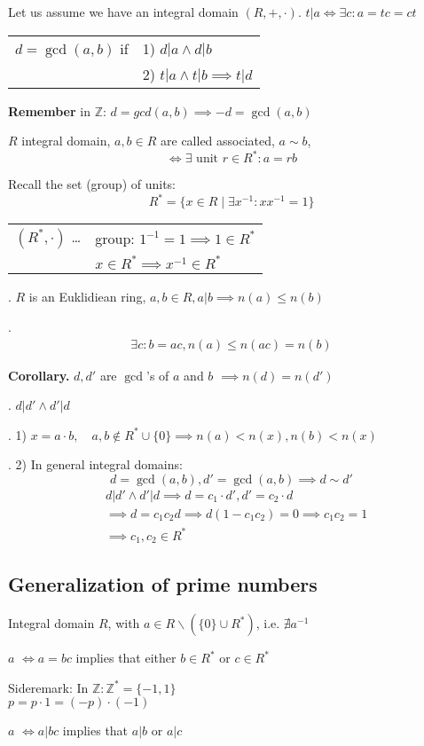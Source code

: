 Let us assume we have an integral domain $(R,+, \cdot)$. 
$t|a \Leftrightarrow \exists c: a=tc =ct$
\begin{tabular}{ll}
$d=\gcd(a,b)$ if & 1) $d|a \land d|b$ \\
  & 2) $t|a \land t|b \implies t|d$
\end{tabular}

\textbf{Remember}
in $\mathbb{Z}$: $d = gcd(a,b) \implies -d = \gcd(a,b)$

\begin{definition}
$R$ integral domain, 
$a,b \in R$ are called associated, $a \sim b$,
\[
  \Leftrightarrow \exists \text{ unit } r \in R^{*}: a = rb
\]
\end{definition}

Recall the set (group) of units:
\[
  R^{*} = \{ x \in R \mid \exists x^{-1} : xx^{-1} = 1\}
\]
\begin{tabular}{ll}
  $(R^{*}, \cdot)$ \ldots 
    & group: $1^{-1} = 1 \implies 1 \in R^{*}$ \\
    & $x\in R^{*} \implies x^{-1} \in R^{*}$
\end{tabular}

\Theorem.
$R$ is an Euklidiean ring, $a,b\in R, a|b \implies n(a) \leq n(b)$

\Proof.
\begin{align*}
  \exists c : b = ac, n(a) \leq n(ac) = n(b)
\end{align*}

\textbf{Corollary.}
$d, d'$ are $\gcd$'s of $a$ and $b$ $\implies n(d) = n(d')$

\Proof.
$d|d' \land d' | d$


\Remark.
1) $x = a\cdot b, \quad a,b\not\in R^{*} \cup \{0\} \implies n(a) < n(x), n(b) < n(x)$

\Remark.
2) In general integral domains: 
\[
  d= \gcd(a,b), d' = \gcd(a,b) \implies d \sim d'
\]
\begin{align*}
  &d|d' \land d'|d \implies d = c_1\cdot d', d' = c_2 \cdot d \\
  &\implies d = c_1c_2 d \implies d (1-c_1c_2) = 0 \implies c_1 c_2 = 1\\
  &\implies c_1,c_2 \in R^{*}
\end{align*}

\subsection{Generalization of prime numbers}
\begin{definition}
  Integral domain $R$, with $a\in R \backslash (\{0\}\cup R^{*})$, i.e. $\nexists a^{-1}$

$a$  $\Leftrightarrow a = bc$ implies that either $b\in R^{*}$ or $c\in R^{*}$

Sideremark: 
In $\mathbb{Z}: \mathbb{Z}^{*} = \{-1, 1\}$ \\
$p = p \cdot 1 = (-p) \cdot (-1)$

$a$  $\Leftrightarrow a | bc$ implies that $a|b$ or $a|c$
\end{definition}

